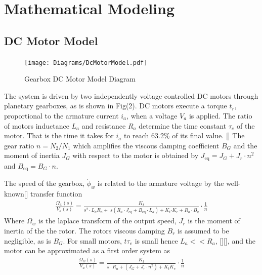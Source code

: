    \pagebreak{}

    \section{Mathematical Modeling} %
    \subsection{DC Motor Model}    
    \begin{figure}[H]
        \centering
            \texttt{[image: Diagrams/DcMotorModel.pdf]}
        \caption{Gearbox DC Motor Model Diagram}
    \end{figure}
    The system is driven by two independently voltage controlled DC motors through 
    planetary gearboxes, as is shown in Fig(2). 
    DC motors execute a torque $t_r$, proportional to the armature current $i_a$,
    when a voltage $V_a$ is applied.
    The ratio of motors inductance $L_a$ and resistance $R_a$ determine the
    time constant $\tau_e$ of the motor. That is the time it takes 
    for $i_a$ to reach 63.2\% of its final value. []
    The gear ratio $n=N_2/N_1$ which amplifies the viscous damping coefficient 
    $B_G$ and the moment of inertia $J_G$ with respect to the motor is obtained by
    $J_{\text{eq}} = J_G + J_r \cdot n^2$ and $B_{\text{eq}} = B_G \cdot n$.

    The speed of the gearbox, $\dot\phi_w$ is related to the armature voltage 
    by the well-known[] transfer function
    \begin{equation}
        \begin{aligned}
            \frac{\Omega_w \left(s\right)}{V_a \left(s\right)}=\frac{K_t }{s^2 \cdot L_a R_a +\;s\left(R_a \cdot J_{\mathrm{eq}} +B_{\mathrm{eq}} \cdot L_a \right)+K_t {\cdot K}_e +R_a \cdot B_q }\cdot\frac{1}{n}
        \end{aligned}
    \end{equation}
    Where $\Omega_w$ is the laplace transform of the output speed, $J_r$ is 
    the moment of inertia of the the rotor.
    The rotors viscous damping $B_r$ is assumed to be negligible, as is $B_G$. 
    For small motors, $t\tau_e$ is small hence $L_a << R_a$, [][], and the motor can be 
    approximated as a first order system as
    \begin{equation}
        \begin{aligned}
            \frac{\Omega_w \left(s\right)}{V_a \left(s\right)}=\frac{K_t }{s\cdot R_a + \left(J_G +{J_r \cdot n}^2 \right)+K_t K_e }\cdot\frac{1}{n}
        \end{aligned}
    \end{equation}

